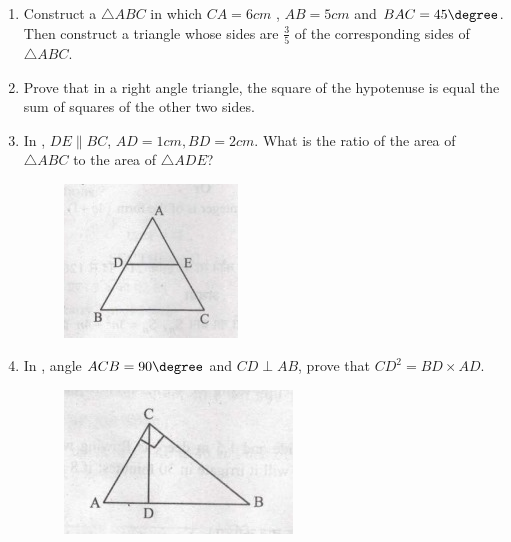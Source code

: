 \begin{enumerate}
\item Construct a $\triangle ABC$ in which $CA = 6cm$ , $AB = 5cm$ and $BAC= 45\degree$. Then  construct a triangle whose sides are $\frac{3}{5}$ of the corresponding sides of $\triangle ABC$.
\item Prove that in a right angle triangle, the square of the hypotenuse is equal the sum of squares of the other two sides.
\item In , $DE \parallel BC$, $ AD = 1 cm , BD = 2 cm$. What is the ratio of the area of $\triangle ABC$ to the area of $\triangle ADE$?
\begin{figure}[H]
			\centering
			\includegraphics[width=\columnwidth]{figs/tri.jpg}
			\caption{}
			\label{fig:figure1}
			
			
		\end{figure} 
\item In , angle $ACB = 90\degree$ and $CD \perp AB$, prove that $CD ^ 2 = BD \times AD$.
\begin{figure}[H]                                                            \centering
                        \includegraphics[width=\columnwidth]{figs/i3.jpg}
			\caption{}
			\label{fig:figure3}
                \end{figure}
                

\end{enumerate}
